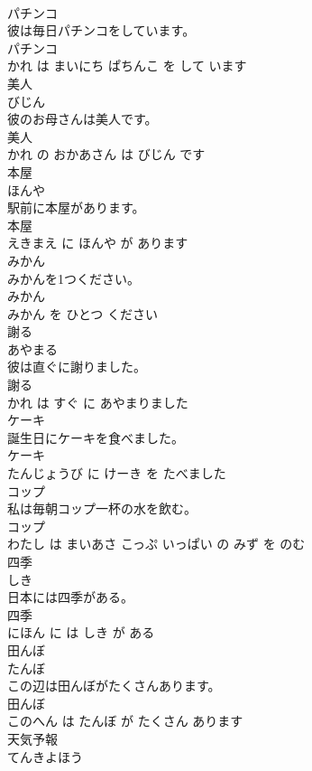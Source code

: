 \documentclass[8pt]{extreport}
\begin{document}
\begin{CJK}{UTF8}{min}
\\	パチンコ	
\\	彼は毎日パチンコをしています。	
\\	パチンコ 
\\	かれ は まいにち ぱちんこ を して います			
\\	美人	
\\	びじん			
\\	彼のお母さんは美人です。	
\\	美人 
\\	かれ の おかあさん は びじん です			
\\	本屋	
\\	ほんや			
\\	駅前に本屋があります。	
\\	本屋 
\\	えきまえ に ほんや が あります			
\\	みかん	
\\	みかんを1つください。	
\\	みかん 
\\	みかん を ひとつ ください			
\\	謝る	
\\	あやまる			
\\	彼は直ぐに謝りました。	
\\	謝る 
\\	かれ は すぐ に あやまりました			
\\	ケーキ	
\\	誕生日にケーキを食べました。	
\\	ケーキ 
\\	たんじょうび に けーき を たべました			
\\	コップ	
\\	私は毎朝コップ一杯の水を飲む。	
\\	コップ 
\\	わたし は まいあさ こっぷ いっぱい の みず を のむ			
\\	四季	
\\	しき			
\\	日本には四季がある。	
\\	四季 
\\	にほん に は しき が ある			
\\	田んぼ	
\\	たんぼ			
\\	この辺は田んぼがたくさんあります。	
\\	田んぼ 
\\	このへん は たんぼ が たくさん あります			
\\	天気予報	
\\	てんきよほう			

\end{CJK}
\end{document}
